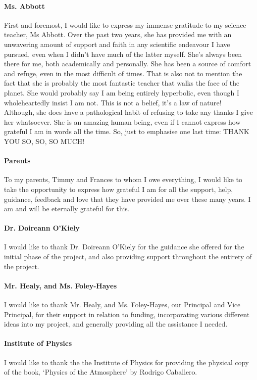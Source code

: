 \paragraph{Ms. Abbott} First and foremost, I would like to express my immense gratitude to my science teacher, Ms Abbott. Over the past two years, she has provided me with an unwavering amount of support and faith in any scientific endeavour I have pursued, even when I didn't have much of the latter myself. She’s always been there for me, both academically and personally. She has been a source of comfort and refuge, even in the most difficult of times. That is also not to mention the fact that she is probably the most fantastic teacher that walks the face of the planet. She would probably say I am being entirely hyperbolic, even though I wholeheartedly insist I am not. This is not a belief, it's a law of nature! Although, she does have a pathological habit of refusing to take any thanks I give her whatsoever. She is an amazing human being, even if I cannot express how grateful I am in words all the time. So, just to emphasise one last time:  THANK YOU SO, SO, SO MUCH!

\paragraph{Parents} To my parents, Timmy and Frances to whom I owe everything, I would like to take the opportunity to express how grateful I am for all the support, help, guidance, feedback and love that they have provided me over these many years. I am and will be eternally grateful for this.

\paragraph{Dr. Doireann O'Kiely} I would like to thank Dr. Doireann O'Kiely for the guidance she offered for the initial phase of the project, and also providing support throughout the entirety of the project.

\paragraph{Mr. Healy, and Ms. Foley-Hayes}
I would like to thank Mr. Healy, and Ms. Foley-Hayes, our Principal and Vice Principal, for their support in relation to funding, incorporating various different ideas into my project, and generally providing all the assistance I needed.

\paragraph{Institute of Physics}
I would like to thank the the Institute of Physics for providing the physical copy of the book, `Physics of the Atmosphere' by Rodrigo Caballero.
